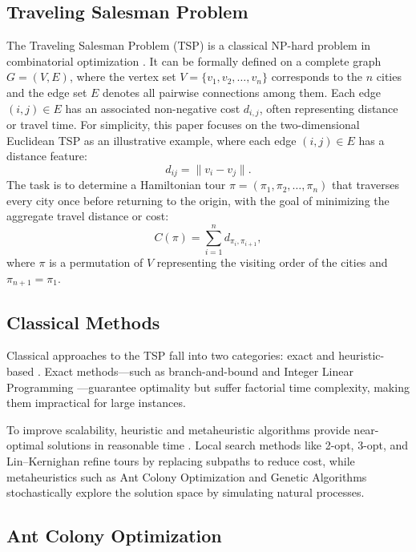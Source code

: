 \documentclass[a4paper,conference]{IEEEtran}
\begin{document}
\subsection{Traveling Salesman Problem}
The Traveling Salesman Problem (TSP) is a classical NP-hard problem in combinatorial optimization \cite{TSP1,TSP3}. It can be formally defined on a complete graph $G=(V,E)$, where the vertex set $V=\{v_1,v_2,\dots,v_n\}$ corresponds to the $n$ cities and the edge set $E$ denotes all pairwise connections among them. Each edge $(i,j)\in E$ has an associated non-negative cost $d_{i,j}$, often representing distance or travel time. For simplicity, this paper focuses on the two-dimensional Euclidean TSP as an illustrative example, where each edge $(i,j)\in E$ has a distance feature:
\begin{equation}
d_{ij} = \|v_i - v_j\|.
\end{equation}
The task is to determine a Hamiltonian tour $\pi = (\pi_1, \pi_2, \dots, \pi_n)$ that traverses every city once before returning to the origin, with the goal of minimizing the aggregate travel distance or cost:
\begin{equation}
C(\pi) = \sum_{i=1}^n d_{\pi_i,\pi_{i+1}},
\end{equation}
where $\pi$ is a permutation of $V$ representing the visiting order of the cities and $\pi_{n+1}=\pi_1$.

\subsection{Classical Methods}
Classical approaches to the TSP fall into two categories: exact and heuristic-based \cite{TSP2}. Exact methods—such as branch-and-bound \cite{branch} and Integer Linear Programming \cite{LP}—guarantee optimality but suffer factorial time complexity, making them impractical for large instances.

To improve scalability, heuristic and metaheuristic algorithms provide near-optimal solutions in reasonable time \cite{MetaHeuristic}. Local search methods like 2-opt, 3-opt, and Lin–Kernighan \cite{twoopt,LKH} refine tours by replacing subpaths to reduce cost, while metaheuristics such as Ant Colony Optimization \cite{ACO2} and Genetic Algorithms \cite{GA} stochastically explore the solution space by simulating natural processes.

\subsection{Ant Colony Optimization}
\end{document}
